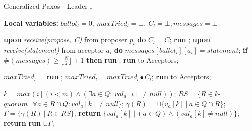 \documentclass[runningheads,a4paper]{llncs}
\begin{document}
\begin{algorithm}
	\caption{Generalized Paxos - Leader l}
	\label{alg:leader}
	\textbf{Local variables:} $ballot_l = 0,\ maxTried_l = \bot,\ C_l = \bot, messages = \bot$
	\begin{algorithmic}[1]
		\State \textbf{upon} \textit{receive(propose, C)} from proposer $p_i$ \textbf{do} 
		\State \hspace{\algorithmicindent} $C_l = C$;
		\State \hspace{\algorithmicindent}\textbf{run} ;
		\State
		\State \textbf{upon} \textit{receive(statement)} from acceptor $a_i$ \textbf{do}
		\State \hspace{\algorithmicindent}  $messages[ballot_l][a_i] = statement$;
		\State \hspace{\algorithmicindent} \textbf{if} $\#(messages) \geq \lfloor \frac{N}{2} \rfloor +1$ \textbf{then} 
		\State \hspace{\algorithmicindent}\hspace{\algorithmicindent}\textbf{run} ;
		\State
		\State \textbf{run}  to Acceptors;
		\EndFunction
		
		\State
		\State $maxTried_l$ = \textbf{run} ;
		\State $maxTried_l = maxTried_l \bullet C_l$;
		\State \textbf{run}  to Acceptors;
		\EndFunction
		
		\State
		\State $k = max(i\ |\ (i < m) \wedge (\exists a \in Q :\ val_a[i]\ \neq null))$;
		\State $RS = \{R \in k$-$quorum\ |\ \forall a \in R \cap Q : val_a[k] \neq null\}$;
		\State $\gamma(R) = \sqcap \{v_a[k]\ |\ a \in Q \cap R \}$;
		\State $\Gamma = \{\gamma(R)\ |\ R \in RS \}$;
		\State
		\State \textbf{return} $\{val_a[k]\ |\ (a \in Q) \wedge (val_a[k] \neq null)\}$;
		\Else
		\State \textbf{return} \textbf{run} $\sqcup \Gamma$;
		\EndIf
		\EndFunction
		
	\end{algorithmic}
\end{algorithm}
\end{document}
